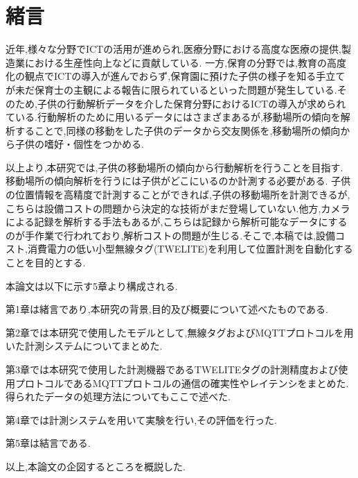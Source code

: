 \chapter{緒言}


\indent
近年,様々な分野でICTの活用が進められ,医療分野における高度な医療の提供,製造業における生産性向上などに貢献している.
一方,保育の分野では,教育の高度化の観点でICTの導入が進んでおらず,保育園に預けた子供の様子を知る手立てが未だ保育士の主観による報告に限られているといった問題が発生している.そのため,子供の行動解析データを介した保育分野におけるICTの導入が求められている.行動解析のために用いるデータにはさまざまあるが,移動場所の傾向を解析することで,同様の移動をした子供のデータから交友関係を,移動場所の傾向から子供の嗜好・個性をつかめる.

以上より,本研究では,子供の移動場所の傾向から行動解析を行うことを目指す.
移動場所の傾向解析を行うには子供がどこにいるのか計測する必要がある.
子供の位置情報を高精度で計測することができれば,子供の移動場所を計測できるが,こちらは設備コストの問題から決定的な技術がまだ登場していない.\cite{ntt}他方,カメラによる記録を解析する手法もあるが,こちらは記録から解析可能なデータにするのが手作業で行われており,解析コストの問題が生じる.そこで,本稿では,設備コスト,消費電力の低い小型無線タグ(TWELITE)を利用して位置計測を自動化することを目的とする.\newline

本論文は以下に示す5章より構成される.

第1章は緒言であり,本研究の背景,目的及び概要について述べたものである.

第2章では本研究で使用したモデルとして,無線タグおよびMQTTプロトコルを用いた計測システムについてまとめた.

第3章では本研究で使用した計測機器であるTWELITEタグの計測精度および使用プロトコルであるMQTTプロトコルの通信の確実性やレイテンシをまとめた.
得られたデータの処理方法についてもここで述べた.

第4章では計測システムを用いて実験を行い,その評価を行った.

第5章は結言である.

以上,本論文の企図するところを概説した.
